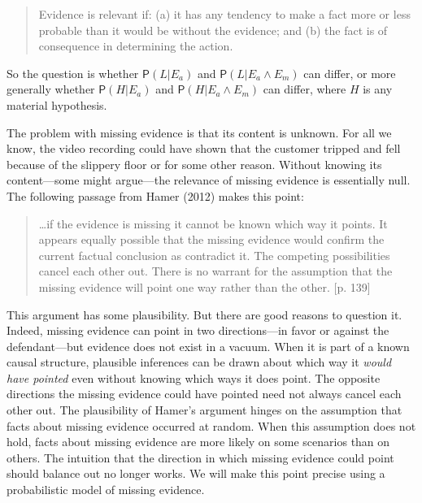 \documentclass[
  10pt,
  dvipsnames,enabledeprecatedfontcommands]{scrartcl}
\newcommand{\pr}[1]{\mathsf{P}(#1)}
\begin{document}
\begin{quote}
Evidence is relevant if: (a) it has any tendency to make a fact more or less probable than it would be without the evidence; and (b) the fact is of consequence in determining the action.
\end{quote}

\noindent So the question is whether \(\pr{L \vert E_a}\) and
\(\pr{L \vert E_a \wedge E_m}\) can differ, or more generally whether
\(\pr{H \vert E_a}\) and \(\pr{H \vert E_a \wedge E_m}\) can differ,
where \(H\) is any material hypothesis.

The problem with missing evidence is that its content is unknown. For
all we know, the video recording could have shown that the customer
tripped and fell because of the slippery floor or for some other reason.
Without knowing its content---some might argue---the relevance of
missing evidence is essentially null. The following passage from Hamer
(2012) makes this point:

\begin{quote}
\dots if the evidence is missing it cannot be known which way it points.
It appears equally possible that the missing evidence would confirm the current factual conclusion as contradict it. The competing possibilities cancel each other out. There is no warrant for the assumption that the missing evidence will point one way rather than the other. [p. 139]
\end{quote}

\noindent This argument has some plausibility. But there are good
reasons to question it. Indeed, missing evidence can point in two
directions---in favor or against the defendant---but evidence does not
exist in a vacuum. When it is part of a known causal structure,
plausible inferences can be drawn about which way it \emph{would have
pointed} even without knowing which ways it does point. The opposite
directions the missing evidence could have pointed need not always
cancel each other out. The plausibility of Hamer's argument hinges on
the assumption that facts about missing evidence occurred at random.
When this assumption does not hold, facts about missing evidence are
more likely on some scenarios than on others. The intuition that the
direction in which missing evidence could point should balance out no
longer works. We will make this point precise using a probabilistic
model of missing evidence.
\end{document}
